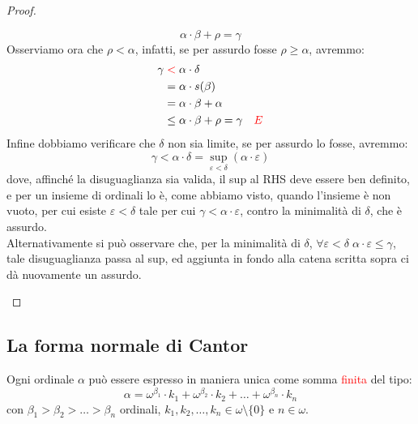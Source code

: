 \begin{proof}
\begin{itemize}
		\[ \alpha \cdot \beta + \rho = \gamma
			\]
		Osserviamo ora che $\rho < \alpha$, infatti, se per assurdo fosse $\rho \geq \alpha$, avremmo:
		\begin{align*}
			\gamma & \;\textcolor{red}{<} \; \alpha \cdot \delta \\
				   & = \alpha \cdot s(\beta) \\
				   & = \alpha \cdot \beta + \alpha \\
				   & \leq \alpha \cdot \beta + \rho = \gamma \quad \textcolor{red}{\lightning}
		\end{align*}
		Infine dobbiamo verificare che $\delta$ non sia limite, se per assurdo lo fosse, avremmo:
		\[ \gamma < \alpha \cdot \delta = \sup_{\varepsilon < \delta} (\alpha \cdot \varepsilon)
			\]
		dove, affinch\'e la disuguaglianza sia valida, il sup al RHS deve essere ben definito, e per un insieme di ordinali lo \`e, come abbiamo visto, quando l'insieme \`e non vuoto,
		per cui esiste $\varepsilon < \delta$ tale per cui $\gamma < \alpha \cdot \varepsilon$, contro la minimalit\`a di $\delta$, che \`e assurdo.\\
		Alternativamente si pu\`o osservare che, per la minimalit\`a di $\delta$, $\forall \varepsilon < \delta \; \alpha \cdot \varepsilon \leq \gamma$, tale disuguaglianza passa al sup,
		ed aggiunta in fondo alla catena scritta sopra ci d\`a nuovamente un assurdo.
	\end{itemize}
\end{proof}

\subsection{La forma normale di Cantor}

\begin{theorem}
	Ogni ordinale $\alpha$ pu\`o essere espresso in maniera unica come somma \textcolor{red}{finita} del tipo:
	\[ \alpha = \omega^{\beta_1} \cdot k_1 + \omega^{\beta_2} \cdot k_2 + \ldots + \omega^{\beta_n} \cdot k_n
		\]
	con $\beta_1 > \beta_2 > \ldots > \beta_n$ ordinali, $k_1,k_2,\ldots,k_n \in \omega\setminus\{0\}$ e $n \in \omega$.
\end{theorem}

